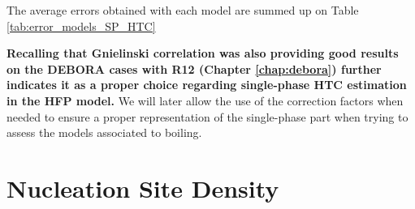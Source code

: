 The average errors obtained with each model are summed up on Table \ref{tab:error_models_SP_HTC}

\begin{table}[h!]


\noindent{}
\caption{Average errors achieved by the considered models on each data sets.}
\label{tab:error_models_SP_HTC}
\end{table}


\textbf{Recalling that Gnielinski correlation was also providing good results on the DEBORA cases with R12 (Chapter \ref{chap:debora}) further indicates it as a proper choice regarding single-phase HTC estimation in the HFP model.} We will later allow the use of the correction factors when needed to ensure a proper representation of the single-phase part when trying to assess the models associated to boiling.







\section{Nucleation Site Density}
\label{sec:NSD}

